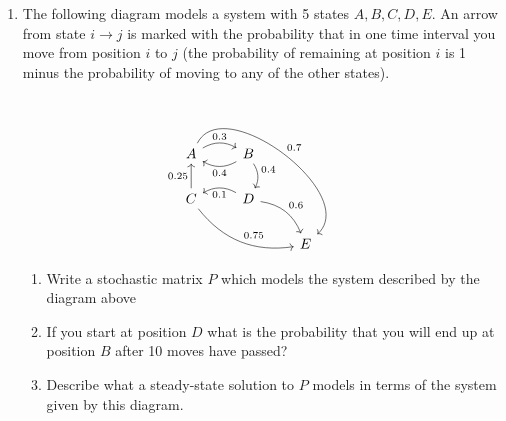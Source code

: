 \documentclass[12pt]{article}
\numberwithin{equation}{subsection}
\numberwithin{figure}{subsection}
\theoremstyle{note}
\begin{document}
\begin{enumerate}[label=\arabic*.]
\begin{enumerate}
	
	\end{enumerate} 
	
	\item The following diagram models a system with 5 states $A,B,C,D,E$. An arrow from state $i\to j$ is marked with the probability that in one time interval you move from position $i$ to $j$ (the probability of remaining at position $i$ is 1 minus the probability of moving to any of the other states). \[ \begin{tikzcd} A \arrow[bend left]{r}{0.3} \arrow[bend left=100]{ddrr}{0.7} & B \arrow[bend left]{d}{0.4} \arrow[bend left]{l}{0.4} \\ C \arrow{u}{0.25} \arrow[bend right]{drr}{0.75} & D  \arrow[bend right]{l}{0.1} \arrow[bend left]{dr}{0.6} \\ && E\end{tikzcd}\]
	
	\begin{enumerate}
		\item Write a stochastic matrix $P$ which models the system described by the diagram above
		\item If you start at position $D$ what is the probability that you will end up at position $B$ after 10 moves have passed?
		\item Describe what a steady-state solution to $P$ models in terms of the system given by this diagram.
	\end{enumerate}
	

\end{enumerate}
\end{document}
